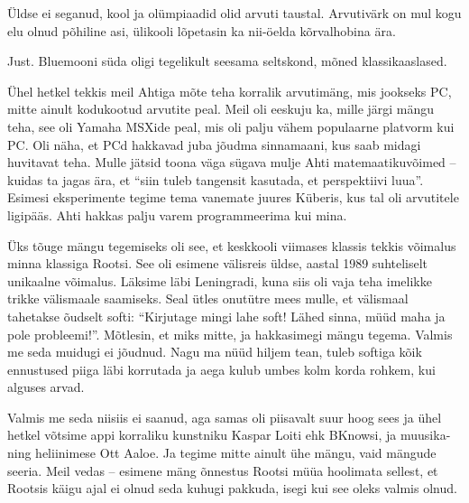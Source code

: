 Üldse ei seganud, kool ja olümpiaadid olid arvuti taustal. Arvutivärk on mul kogu elu olnud põhiline asi, ülikooli lõpetasin ka nii-öelda kõrvalhobina ära.


Just. Bluemooni süda oligi tegelikult seesama seltskond, mõned klassikaaslased. 


Ühel hetkel tekkis meil Ahtiga 
mõte teha korralik arvutimäng, mis jookseks PC, mitte 
ainult kodukootud arvutite peal. Meil oli eeskuju ka, mille järgi 
mängu teha, see oli Yamaha MSXide peal, mis oli 
palju vähem populaarne platvorm kui PC. Oli näha, et PCd hakkavad juba jõudma 
sinnamaani, kus saab midagi huvitavat teha. Mulle jätsid toona väga sügava 
mulje Ahti matemaatikuvõimed -- kuidas ta jagas ära, et 
\enquote{siin tuleb tangensit kasutada, et perspektiivi luua}. 
Esimesi eksperimente tegime tema vanemate juures Küberis, kus tal 
oli arvutitele ligipääs. Ahti hakkas palju varem programmeerima kui mina. 

Üks tõuge mängu tegemiseks oli see, et keskkooli viimases klassis tekkis võimalus minna klassiga Rootsi. See oli esimene 
välisreis üldse, aastal 1989 suhteliselt unikaalne võimalus. Läksime läbi 
Leningradi, kuna siis oli vaja teha imelikke trikke välismaale 
saamiseks. Seal ütles onutütre mees mulle, et välismaal tahetakse õudselt 
softi: \enquote{Kirjutage mingi lahe soft! Lähed sinna, müüd maha ja pole
probleemi!}. Mõtlesin, et miks mitte, ja hakkasimegi mängu tegema. 
Valmis me seda muidugi ei 
jõudnud. Nagu ma nüüd hiljem tean, tuleb softiga kõik ennustused 
piiga läbi korrutada ja aega kulub umbes kolm korda rohkem, kui alguses arvad. 

Valmis me seda niisiis ei saanud, aga samas oli piisavalt suur hoog sees ja 
ühel hetkel võtsime appi korraliku kunstniku Kaspar 
Loiti ehk BKnowsi, ja muusika- ning heliinimese Ott 
Aaloe. Ja tegime mitte ainult ühe mängu, vaid 
mängude seeria. Meil vedas -- esimene mäng 
õnnestus Rootsi müüa hoolimata sellest, et Rootsis käigu ajal ei olnud seda 
kuhugi pakkuda, isegi kui see oleks valmis olnud.


